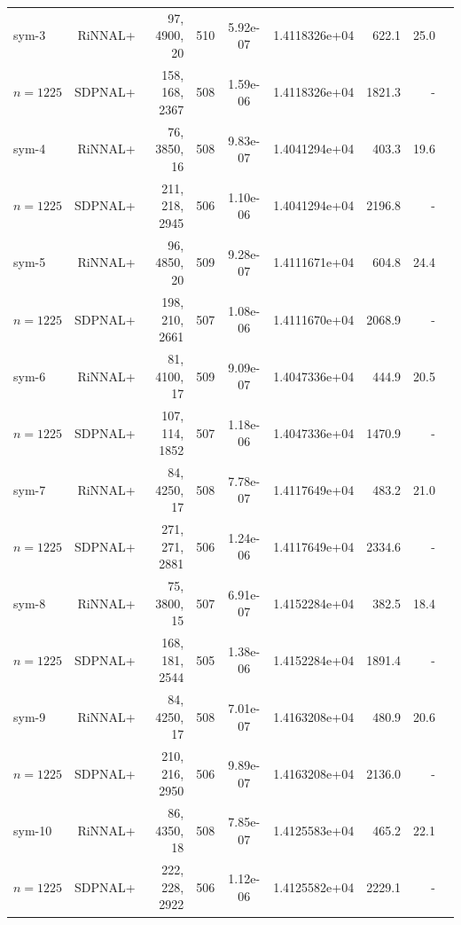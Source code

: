 \documentclass[11pt]{article}
\theoremstyle{plain}
\begin{document}
\begin{footnotesize}
\begin{longtable}[c]{lrrrccrrr}
sym-3& RiNNAL+ & 97, 4900, 20 & 510 & 5.92e-07 & 1.4118326e+04 & 622.1 &25.0 \\ 
$n=1225$ & SDPNAL+ & 158, 168, 2367 & 508& 1.59e-06 & 1.4118326e+04 & 1821.3 & - \\ [3pt] 

sym-4& RiNNAL+ & 76, 3850, 16 & 508 & 9.83e-07 & 1.4041294e+04 & 403.3 &19.6 \\ 
$n=1225$ & SDPNAL+ & 211, 218, 2945 & 506& 1.10e-06 & 1.4041294e+04 & 2196.8 & - \\ [3pt] 

sym-5& RiNNAL+ & 96, 4850, 20 & 509 & 9.28e-07 & 1.4111671e+04 & 604.8 &24.4 \\ 
$n=1225$ & SDPNAL+ & 198, 210, 2661 & 507& 1.08e-06 & 1.4111670e+04 & 2068.9 & - \\ [3pt] 

sym-6& RiNNAL+ & 81, 4100, 17 & 509 & 9.09e-07 & 1.4047336e+04 & 444.9 &20.5 \\ 
$n=1225$ & SDPNAL+ & 107, 114, 1852 & 507& 1.18e-06 & 1.4047336e+04 & 1470.9 & - \\ [3pt] 

sym-7& RiNNAL+ & 84, 4250, 17 & 508 & 7.78e-07 & 1.4117649e+04 & 483.2 &21.0 \\ 
$n=1225$ & SDPNAL+ & 271, 271, 2881 & 506& 1.24e-06 & 1.4117649e+04 & 2334.6 & - \\ [3pt] 

sym-8& RiNNAL+ & 75, 3800, 15 & 507 & 6.91e-07 & 1.4152284e+04 & 382.5 &18.4 \\ 
$n=1225$ & SDPNAL+ & 168, 181, 2544 & 505& 1.38e-06 & 1.4152284e+04 & 1891.4 & - \\ [3pt] 

sym-9& RiNNAL+ & 84, 4250, 17 & 508 & 7.01e-07 & 1.4163208e+04 & 480.9 &20.6 \\ 
$n=1225$ & SDPNAL+ & 210, 216, 2950 & 506& 9.89e-07 & 1.4163208e+04 & 2136.0 & - \\ [3pt] 

sym-10& RiNNAL+ & 86, 4350, 18 & 508 & 7.85e-07 & 1.4125583e+04 & 465.2 &22.1 \\ 
$n=1225$ & SDPNAL+ & 222, 228, 2922 & 506& 1.12e-06 & 1.4125582e+04 & 2229.1 & - \\ [3pt] 

\end{longtable}
\end{footnotesize}
\end{document}
